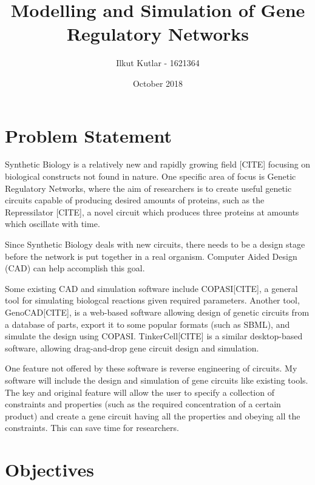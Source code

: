 \documentclass{article}
\title{Modelling and Simulation of Gene Regulatory Networks}
\author{Ilkut Kutlar - 1621364}
\date{October 2018}
\begin{document}
	\maketitle
	
	\section{Problem Statement}
	
	\par Synthetic Biology is a relatively new and rapidly growing field [CITE] focusing on biological constructs not found in nature. One specific area of focus is Genetic Regulatory Networks, where the aim of researchers is to create useful genetic circuits capable of producing desired amounts of proteins, such as the Repressilator [CITE], a novel circuit which produces three proteins at amounts which oscillate with time.
	\par Since Synthetic Biology deals with new circuits, there needs to be a design stage before the network is put together in a real organism. Computer Aided Design (CAD) can help accomplish this goal.
	\par Some existing CAD and simulation software include COPASI[CITE], a general tool for simulating biologcal reactions given required parameters. Another tool, GenoCAD[CITE], is a web-based software allowing design of genetic circuits from a database of parts, export it to some popular formats (such as SBML), and simulate the design using COPASI. TinkerCell[CITE] is a similar desktop-based software, allowing drag-and-drop gene circuit design and simulation.
	\par One feature not offered by these software is reverse engineering of circuits. My software will include the design and simulation of gene circuits like existing tools. The key and original feature will allow the user to specify a collection of constraints and properties (such as the required concentration of a certain product) and create a gene circuit having all the properties and obeying all the constraints. This can save time for researchers.
	
	
	
	\section{Objectives}
	
\end{document}
